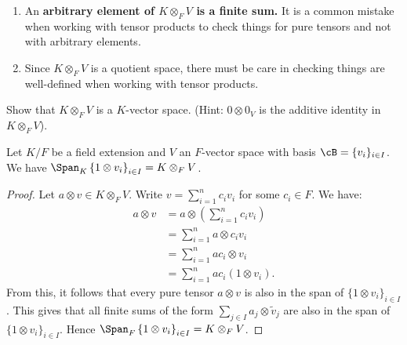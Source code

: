     \begin{note}
        \phantom{a}
        \begin{enumerate}[label = (\arabic*)]
            \item An \textbf{arbitrary element of $K \otimes_F V$ is a finite sum.} It is a common mistake when working with tensor products to check things for pure tensors and not with arbitrary elements.
            \item Since $K \otimes_F V$ is a quotient space, there must be care in checking things are well-defined when working with tensor products. 
        \end{enumerate}
    \end{note}

    \begin{exercise}
        Show that $K \otimes_F V$ is a $K$-vector space. (Hint: $0 \otimes 0_V$ is the additive identity in $K \otimes_F V$).
    \end{exercise}

    \begin{proposition}\label{prop:basis-of-tensor}
        Let $K/F$ be a field extension and $V$ an $F$-vector space with basis $\cB = \{v_i\}_{i \in I}$. We have $\Span_K \left\{1 \otimes v_i\right\}_{i \in I} = K \otimes_F V$.
    \end{proposition}
        \begin{proof}
            Let $a \otimes v \in K\otimes_F V$. Write $v = \sum_{i=1}^n c_i v_i$ for some $c_i \in F$. We have:
                \begin{equation*}
                \begin{split}
                    a \otimes v 
                    & = a \otimes \left(\sum_{i=1}^n c_i v_i\right) \\
                    & = \sum_{i = 1}^n a \otimes c_i v_i \\
                    & = \sum_{i = 1}^n ac_i \otimes v_i \\
                    & = \sum_{i = 1}^n ac_i(1 \otimes v_i).
                \end{split}
                \end{equation*}
            From this, it follows that every pure tensor $a \otimes v$ is also in the span of $\{1 \otimes v_i\}_{i \in I}$. This gives that all finite sums of the form $\sum_{j \in I}a_j \otimes \tilde{v}_j$ are also in the span of $\{1 \otimes v_i\}_{i \in I}$. Hence $\Span_F \left\{1 \otimes v_i\right\}_{i \in I} = K \otimes_F V$.
        \end{proof}


